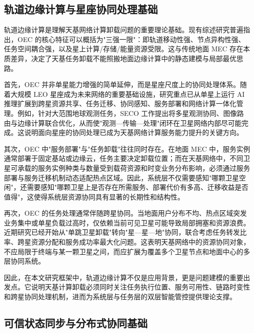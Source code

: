 \subsection{轨道边缘计算与星座协同处理基础}

轨道边缘计算是理解天基网络计算卸载问题的重要理论基础。现有综述研究普遍指出，OEC 的核心特征可以概括为"三强一限"：即轨道移动性强、节点异构性强、任务空间耦合强，以及星上计算/存储/能量资源受限\cite{Yin2025OECSurvey}。这与传统地面 MEC 存在本质差异，决定了天基任务卸载不能照搬地面边缘计算中的静态建模与局部最优思路。

首先，OEC 并非单星能力增强的简单延伸，而是星座尺度上的协同处理体系。随着大规模 LEO 星座成为未来网络的重要基础设施，研究重点已从单星上运行 AI 推理扩展到跨星资源共享、任务迁移、协同感知、服务部署和网络计算一体化管理\cite{Huang2024ICNLSMC,Tang2024TwoTimescaleJSAC}。例如，针对大范围地球观测任务，SECO 工作提出将多星观测协同、图像路由与边缘计算联合优化，从而使"观测—传输—处理"闭环在卫星网络内部尽可能完成\cite{Zhai2024SECO}。这说明面向星座的协同处理已成为天基网络计算服务能力提升的关键方向。

其次，OEC 中"服务部署"与"任务卸载"往往同时存在。在地面 MEC 中，服务实例通常部署于固定基站或边缘云，任务主要决定卸载位置；而在天基网络中，不同卫星可承载的服务实例种类与数量受到载荷资源和时变业务分布影响，必须通过服务部署与服务迁移机制动态适配热点区域\cite{Tang2024TwoTimescaleJSAC,Feng2026LatencyAware}。因此，系统层不仅需要感知"哪颗卫星空闲"，还需要感知"哪颗卫星上是否存在所需服务、部署代价有多高、迁移收益是否值得"，这使得系统层资源协同具有显著的长期性和结构性。

再次，OEC 的任务处理通常伴随跨星协同。当地面用户分布不均、热点区域突发业务集中或单星负载过高时，仅依赖当前可见卫星可能导致局部拥塞和资源浪费。近期研究已经开始从"单跳卫星卸载"转向"星—星—地"协同，联合考虑任务转发比率、跨星资源分配和服务成功率最大化问题\cite{Zhang2024PeerOffloading,Liu2026DeviceSatelliteSatellite}。这表明天基网络中的资源协同对象，不应局限于终端与某一颗卫星之间，而应扩展为覆盖多个卫星节点和地面中心的多层协同系统。

因此，在本文研究框架中，轨道边缘计算不仅是应用背景，更是问题建模的重要出发点。它说明天基计算卸载必须同时关注任务执行位置、服务可用性、链路时变性和跨星协同处理机制，进而为系统层与任务层的双层智能管控提供理论支撑。

\subsection{可信状态同步与分布式协同基础}

